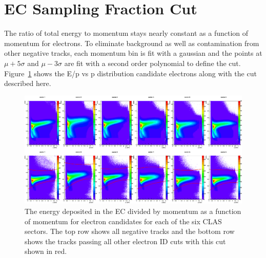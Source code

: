 \section{EC Sampling Fraction Cut}
\label{sec:ECsampling}
%
The ratio of total energy to momentum stays nearly constant as a function of momentum for electrons.
To eliminate background as well as contamination from other negative tracks, each momentum bin is fit with a gaussian and the points at $\mu + 5\sigma$ and $\mu - 3\sigma$ are fit with a second order polynomial to define the cut.
Figure~\ref{fig:ECsampling_c0c1_6sects} shows the E/p vs p distribution candidate electrons along with the cut described here.
%
\begin{figure}
\centering
\includegraphics[width=8.5in]{figures/ECsampling_c0c1_6sects.png}
\caption{The energy deposited in the EC divided by momentum as a function of momentum for electron candidates for each of the six CLAS sectors. The top row shows all negative tracks and the bottom row shows the tracks passing all other electron ID cuts with this cut shown in red.}
\label{fig:ECsampling_c0c1_6sects}
\end{figure}
%
%
